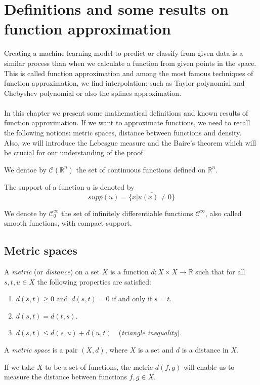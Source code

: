 \documentclass[../main.tex]{subfiles}
\begin{document}
\chapter{Definitions and some results on function approximation} \label{ch:methods}
\noindent Creating a machine learning model to predict or classify from given data is a similar process than when we calculate a function from given points in the space. This is called function approximation and among the most famous techniques of function approximation, we find interpolation: such as Taylor polynomial and Chebyshev polynomial or also the splines approximation. \\ \\ 
\noindent In this chapter we present some mathematical definitions and known results of function approximation. 
If we want to approximate functions, we need to recall the following notions: metric spaces, distance between functions and density. Also, we will introduce the Lebesgue measure and the Baire's theorem which will be crucial for our understanding of the proof. 

\begin{definition} We dentoe by $\mathcal{C}(\mathbb{R}^n)$ the set of continuous functions defined on $\mathbb{R}^n.$
\end{definition}
\begin{definition}
	The support of a function $u$ is denoted by $$supp(u)= \overline{\{x | u(x)\neq 0\}}$$
\end{definition}
\begin{definition} We denote by
	$ \mathcal{C}^\infty_0$ the set of infinitely differentiable functions $\mathcal{C}^\infty$, also called smooth functions, with compact support. 
\end{definition}

\section{Metric spaces}
\begin{definition}\label{thm:first}
	A \emph{metric} (or \emph{distance}) on a set $X$ is a function $d:X\times X\rightarrow \mathbb{R} $ such that for all $s,t, u\in X$ the following properties are satisfied:
	\begin{enumerate}
		\item $d(s,t) \geq 0$ and $ \, d(s,t)=0$ if and only if $ s=t$.
		\item $d(s,t)=d(t,s)$.
		\item $d(s,t)\leq d(s,u)+d(u,t)\quad$(\emph{triangle inequality}).
	\end{enumerate}
\begin{definition}
A \emph{metric space} is a pair $(X,d)$, where $X$ is a set and $d$ is a distance in $X$.
\end{definition}
\end{definition}
\noindent  If we take $X$ to be a set of functions, the metric $d(f,g)$ will enable us to measure the distance between functions $f,g \in X$.
\end{document}
